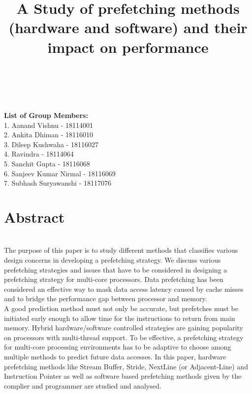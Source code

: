 \documentclass{article}
\begin{document}
\\\title{A Study of prefetching methods (hardware and software) and their impact on performance}

\maketitle
\\\textbf{List of Group Members: }
\\1. Aanand Vishnu - 18114001
\\2. Ankita Dhiman - 18116010
\\3. Dileep Kushwaha - 18116027
\\4. Ravindra - 18114064
\\5. Sanchit Gupta - 18116068
\\6. Sanjeev Kumar Nirmal - 18116069
\\7. Subhash Suryawanshi - 18117076
\section{Abstract}
\\The purpose of this paper is to study different methods that classifies various design concerns in developing a prefetching strategy. We discuss various prefetching strategies and issues that have to be considered in designing a prefetching strategy for multi-core processors. Data prefetching has been considered an effective way to mask data access
latency caused by cache misses and to bridge the performance gap between processor and memory.
\\A good prediction method must not only be accurate, but prefetches must be
initiated early enough to allow time for the instructions to return from main
memory. Hybrid hardware/software controlled strategies are gaining popularity
on processors with multi-thread support. To be effective, a prefetching strategy for multi-core processing environments has to be adaptive to choose among multiple methods to predict future data accesses.
In this paper, hardware prefetching methods like Stream Buffer, Stride, NextLine (or Adjacent-Line) and Instruction Pointer as well as software based prefetching methods given by the complier and programmer are studied and analysed.
\end{document}
